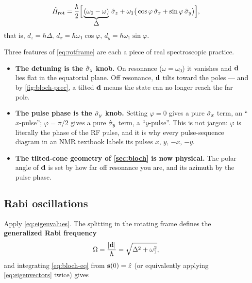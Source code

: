 \begin{keyresult}
\vspace{-0.35cm}
\begin{equation}
\hat{H}_{\rm rot} = \frac{\hbar}{2}\Big[\underbrace{(\omega_0-\omega)}_{\textstyle \Delta}\,\hat{\sigma}_z
   + \omega_1\big(\cos\varphi\,\hat{\sigma}_x + \sin\varphi\,\hat{\sigma}_y\big)\Big],
\label{eq:rotframe}
\end{equation}
that is, $d_z = \hbar\Delta$, $d_x = \hbar\omega_1\cos\varphi$,
$d_y = \hbar\omega_1\sin\varphi$.
\end{keyresult}

\noindent
Three features of \cref{eq:rotframe} are each a piece of real spectroscopic practice.

\begin{itemize}[leftmargin=*,itemsep=3pt]
\item \textbf{The detuning is the $\hat{\sigma}_z$ knob.} On resonance ($\omega=\omega_0$) it
vanishes and $\mathbf{d}$ lies flat in the equatorial plane. Off resonance, $\mathbf{d}$ tilts
toward the poles --- and by \cref{fig:bloch-prec}, a tilted $\mathbf{d}$ means the state can
no longer reach the far pole.

\item \textbf{The pulse phase is the $\hat{\sigma}_y$ knob.} Setting $\varphi=0$ gives a pure
$\hat{\sigma}_x$ term, an ``$x$-pulse''; $\varphi=\pi/2$ gives a pure $\hat{\sigma}_y$ term, a ``$y$-pulse''.
This is not jargon: $\varphi$ is literally the phase of the RF pulse, and it is why every
pulse-sequence diagram in an NMR textbook labels its pulses $x$, $y$, $-x$, $-y$.

\item \textbf{The tilted-cone geometry of \cref{sec:bloch} is now physical.} The polar
angle of $\mathbf{d}$ is set by how far off resonance you are, and its azimuth by the pulse
phase.
\end{itemize}

\subsection{Rabi oscillations}

Apply \cref{eq:eigenvalues}. The splitting in the rotating frame defines the
\textbf{generalized Rabi frequency}
%
\begin{equation}
\Omega = \frac{|\mathbf{d}|}{\hbar} = \sqrt{\Delta^2+\omega_1^2},
\label{eq:rabi-freq}
\end{equation}
%
and integrating \cref{eq:bloch-eq} from $\mathbf{s}(0)=\hat{z}$ (or equivalently applying
\cref{eq:eigenvectors} twice) gives

